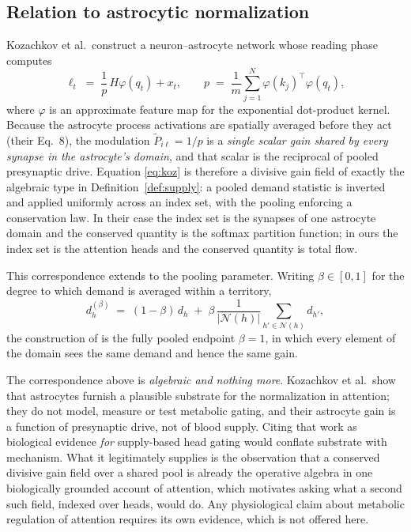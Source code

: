 \subsection{Relation to astrocytic normalization}

Kozachkov et al.\ construct a neuron--astrocyte network whose reading phase computes
\begin{equation}
  \label{eq:koz}
  \ell_t \;=\; \frac{1}{p}\, H\varphi(q_t) + x_t,
  \qquad
  p \;=\; \frac{1}{m} \sum_{j=1}^{N} \varphi(k_j)^{\top} \varphi(q_t),
\end{equation}
where $\varphi$ is an approximate feature map for the exponential dot-product kernel.
Because the astrocyte process activations are spatially averaged before they act
(their Eq.~8), the modulation $\widetilde{P}_{i\ell} = 1/p$ is a \emph{single scalar gain
shared by every synapse in the astrocyte's domain}, and that scalar is the reciprocal of
pooled presynaptic drive. Equation \eqref{eq:koz} is therefore a divisive gain field of
exactly the algebraic type in Definition~\ref{def:supply}: a pooled demand statistic is
inverted and applied uniformly across an index set, with the pooling enforcing a
conservation law. In their case the index set is the synapses of one astrocyte domain and
the conserved quantity is the softmax partition function; in ours the index set is the
attention heads and the conserved quantity is total flow.

This correspondence extends to the pooling parameter. Writing $\beta \in [0,1]$ for the
degree to which demand is averaged within a territory,
\begin{equation}
  d^{(\beta)}_h \;=\; (1-\beta)\, d_h \;+\; \beta \,
  \frac{1}{|\mathcal{N}(h)|} \sum_{h' \in \mathcal{N}(h)} d_{h'},
\end{equation}
the construction of \cite{kozachkov2023} is the fully pooled endpoint $\beta = 1$, in
which every element of the domain sees the same demand and hence the same gain.

\begin{remark}
\label{rem:scope}
The correspondence above is \emph{algebraic and nothing more}. Kozachkov et al.\ show
that astrocytes furnish a plausible substrate for the normalization in attention; they do
not model, measure or test metabolic gating, and their astrocyte gain is a function of
presynaptic drive, not of blood supply. Citing that work as biological evidence
\emph{for} supply-based head gating would conflate substrate with mechanism. What it
legitimately supplies is the observation that a conserved divisive gain field over a
shared pool is already the operative algebra in one biologically grounded account of
attention, which motivates asking what a second such field, indexed over heads, would do.
Any physiological claim about metabolic regulation of attention requires its own
evidence, which is not offered here.
\end{remark}

